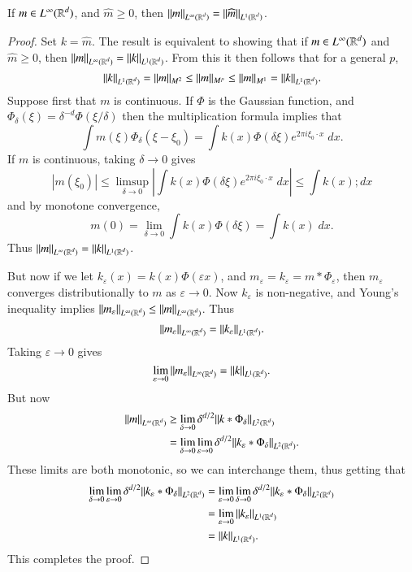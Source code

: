 \begin{lemma} \label{positivel1linfinitylemma}
    If $m \in L^\infty(\operatorname{\mathbb{R}}^d)$, and $\widehat{m} \geq 0$, then $\| m \|_{L^\infty(\operatorname{\mathbb{R}}^d)} = \| \widehat{m} \|_{L^1(\operatorname{\mathbb{R}}^d)}$.
\end{lemma}
\begin{proof}
    Set $k = \widehat{m}$. The result is equivalent to showing that if $m \in L^\infty(\operatorname{\mathbb{R}}^d)$ and $\widehat{m} \geq 0$, then $\| m \|_{L^\infty(\operatorname{\mathbb{R}}^d)} = \| k \|_{L^1(\operatorname{\mathbb{R}}^d)}$. From this it then follows that for a general $p$,
    \[ \| k \|_{L^1(\operatorname{\mathbb{R}}^d)} = \| m \|_{M^2} \leq \| m \|_{M^p} \leq \| m \|_{M^1} = \| k \|_{L^1(\operatorname{\mathbb{R}}^d)}. \]
    Suppose first that $m$ is continuous. If $\Phi$ is the Gaussian function, and $\Phi_\delta(\xi) = \delta^{-d} \Phi(\xi / \delta)$ then the multiplication formula implies that
    \[ \int m(\xi) \Phi_\delta(\xi - \xi_0) = \int k(x) \Phi(\delta \xi) e^{2 \pi i \xi_0 \cdot x}\; dx. \]
    If $m$ is continuous, taking $\delta \to 0$ gives
    \[ |m(\xi_0)| \leq \limsup_{\delta \to 0} \left| \int k(x) \Phi(\delta \xi) e^{2 \pi i \xi_0 \cdot x}\; dx \right| \leq \int k(x); dx \]
    and by monotone convergence,
    \[ m(0) = \lim_{\delta \to 0} \int k(x) \Phi(\delta \xi) = \int k(x)\; dx.  \]
    Thus $\| m \|_{L^\infty(\operatorname{\mathbb{R}}^d)} = \| k \|_{L^1(\operatorname{\mathbb{R}}^d)}$.

    But now if we let $k_\varepsilon(x) = k(x) \Phi(\varepsilon x)$, and $m_\varepsilon = \widehat{k_\varepsilon} = m * \Phi_\varepsilon$, then $m_\varepsilon$ converges distributionally to $m$ as $\varepsilon \to 0$. Now $k_\varepsilon$ is non-negative, and Young's inequality implies $\| m_\varepsilon \|_{L^\infty(\operatorname{\mathbb{R}}^d)} \leq \| m \|_{L^\infty(\operatorname{\mathbb{R}}^d)}$. Thus
    \[ \| m_\varepsilon \|_{L^\infty(\operatorname{\mathbb{R}}^d)} = \| k_\varepsilon \|_{L^1(\operatorname{\mathbb{R}}^d)}. \]
    Taking $\varepsilon \to 0$ gives
    \[ \lim_{\varepsilon \to 0} \| m_\varepsilon \|_{L^\infty(\operatorname{\mathbb{R}}^d)} = \| k \|_{L^1(\operatorname{\mathbb{R}}^d)}. \]
    But now
    \begin{align*}
        \| m \|_{L^\infty(\operatorname{\mathbb{R}}^d)} &\geq \lim_{\delta \to 0} \delta^{d/2} \| k * \Phi_\delta \|_{L^2(\operatorname{\mathbb{R}}^d)}\\
        &= \lim_{\delta \to 0} \lim_{\varepsilon \to 0} \delta^{d/2} \| k_\varepsilon * \Phi_\delta \|_{L^2(\operatorname{\mathbb{R}}^d)}.
    \end{align*}
    These limits are both monotonic, so we can interchange them, thus getting that
    \begin{align*}
        \lim_{\delta \to 0} \lim_{\varepsilon \to 0} \delta^{d/2} \| k_\varepsilon * \Phi_\delta \|_{L^2(\operatorname{\mathbb{R}}^d)} &= \lim_{\varepsilon \to 0} \lim_{\delta \to 0} \delta^{d/2} \| k_\varepsilon * \Phi_\delta \|_{L^2(\operatorname{\mathbb{R}}^d)}\\
        &= \lim_{\varepsilon \to 0} \| k_\varepsilon \|_{L^1(\operatorname{\mathbb{R}}^d)}\\
        &= \| k \|_{L^1(\operatorname{\mathbb{R}}^d)}.
    \end{align*}
    This completes the proof.
\end{proof}

